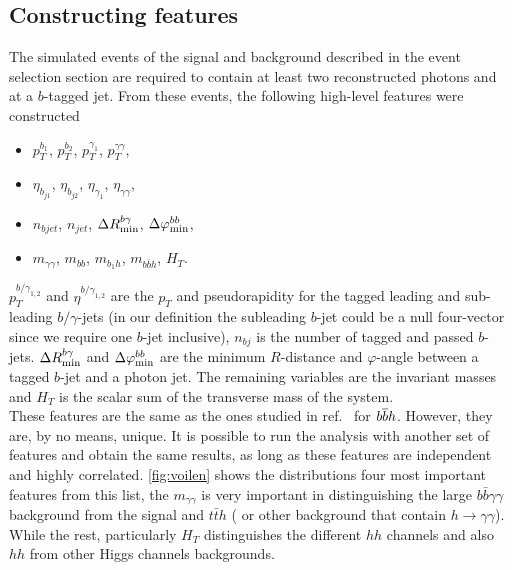 \subsection{Constructing features \label{constructingfeat}}
The simulated events of the signal and background described in the event selection section are required to contain at least two reconstructed photons and at a $b$-tagged jet. From these events, the following high-level features were constructed
\begin{itemize}
	\setlength{\itemsep}{0pt}
	\item $p_T^{b_1}$, $p_T^{b_2}$, $p_T^{\gamma_1}$, $p_T^{\gamma\gamma}$, 
	\item $\eta_{b_{j1}}$, $\eta_{b_{j2}}$, $\eta_{\gamma_1}$, $\eta_{\gamma\gamma}$,
	\item $n_{bjet}$, $n_{jet}$, $\Delta R_{\rm min}^{b\gamma}$, $\Delta \varphi_{\rm min}^{bb}$, 
	\item $m_{\gamma\gamma}$, $m_{bb}$, $m_{b_{1} h}$, $m_{b\bar b h}$, $H_T$.
\end{itemize}
$p_T^{{b/\gamma}_{1,2}}$ and $\eta^{{b/\gamma}_{1,2}}$ are the $p_T$ and pseudorapidity for the tagged leading and sub-leading $b/\gamma$-jets (in our definition the subleading $b$-jet could be a null four-vector since we require one $b$-jet inclusive), $n_{bj}$ is the number of tagged and passed $b$-jets. $\Delta R_{\rm min}^{b\gamma}$ and $\Delta \varphi_{\rm min}^{bb}$ are the minimum $R$-distance and $\varphi$-angle between a tagged $b$-jet and a photon jet. The remaining variables are the invariant masses and $H_T$ is the scalar sum of the transverse mass of the system. \\ These features are the same as the ones studied in ref.~\cite{Grojean:2020ech} for $b\overline bh$. However, they are, by no means, unique. It is possible to run the analysis with another set of features and obtain the same results, as long as these features are independent and highly correlated. \autoref{fig:voilen} shows the distributions four most important features from this list, the $m_{\gamma \gamma}$ is very important in distinguishing the large $b \bar b \gamma \gamma$ background from the signal and $ t\bar t h$ ( or other background that contain $ h \to \gamma \gamma$). While the rest, particularly $ H_T$ distinguishes the different $hh$ channels and also $hh$ from other Higgs channels backgrounds.  
